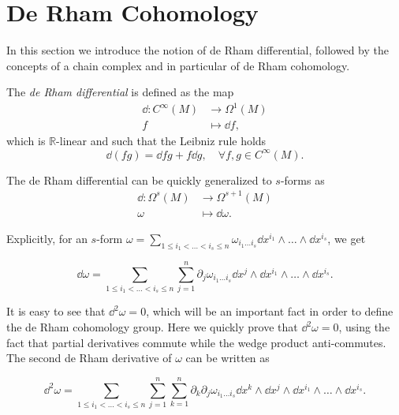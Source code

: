 \section{De Rham Cohomology}
\label{sec:derham}

In this section we introduce the notion of de Rham differential, followed by the concepts of a chain complex and in particular of de Rham cohomology.

\begin{definition}
    The \emph{de Rham differential} is defined as the map
    \begin{align*}
        \dd : C^{\infty}(M) &\rightarrow \Omega^1(M) \\
        f &\mapsto \dd f ,
    \end{align*}
    which is $\mathbb{R}$-linear and such that the Leibniz rule holds
    \begin{equation*}
        \dd (fg) = \dd fg + f \dd g, \quad \forall f, g \in C^{\infty}(M).
    \end{equation*}
\end{definition}

The de Rham differential can be quickly generalized to $s$-forms as
\begin{align*}
    \dd : \Omega^s (M) &\rightarrow \Omega^{s+1}(M) \\
    \omega &\mapsto \dd \omega .
\end{align*}

Explicitly, for an $s$-form $\omega = \sum_{1 \leq i_1 < \ldots < i_s \leq n} \omega_{i_1 \ldots i_s} \dd x^{i_1} \wedge \ldots \wedge \dd x^{i_s}$, we get

\begin{equation*}
    \dd \omega = \sum_{1 \leq i_1 < \ldots < i_s \leq n} \sum_{j = 1}^n \partial_j \omega_{i_1 \ldots i_s} \dd x^j \wedge \dd x^{i_1} \wedge \ldots \wedge \dd x^{i_s} .
\end{equation*}

It is easy to see that $\dd ^2 \omega = 0$, which will be an important fact in order to define the de Rham cohomology group.
Here we quickly prove that $\dd^2 \omega = 0$, using the fact that partial derivatives commute while the wedge product anti-commutes.
The second de Rham derivative of $\omega$ can be written as

\begin{equation*}
    \dd ^2 \omega =
    \sum_{1 \leq i_1 < \ldots < i_s \leq n} \sum_{j = 1}^n \sum_{k = 1}^n
    \partial_k \partial_j \omega_{i_1 \ldots i_s}
    \dd x^k \wedge \dd x^j \wedge \dd x^{i_1} \wedge \ldots \wedge \dd x^{i_s}.
\end{equation*}


